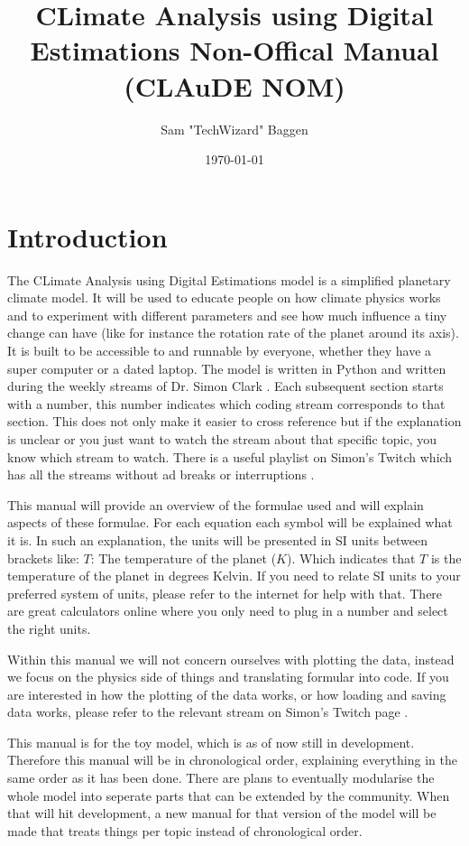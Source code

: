 \documentclass{article}
\title{CLimate Analysis using Digital Estimations Non-Offical Manual (CLAuDE NOM)}
\author{Sam "TechWizard" Baggen}
\date{\today}
\begin{document}
\maketitle

\tableofcontents

\section{Introduction}

The CLimate Analysis using Digital Estimations model is a simplified planetary climate model. It will be used to educate people on how climate physics works and to experiment with different 
parameters and see how much influence a tiny change can have (like for instance the rotation rate of the planet around its axis). It is built to be accessible to and runnable by everyone, 
whether they have a super computer or a dated laptop. The model is written in Python and written during the weekly streams of Dr. Simon Clark \cite{twitch}. Each subsequent section starts with a 
number, this number indicates which coding stream corresponds to that section. This does not only make it easier to cross reference but if the explanation is unclear or you just want to watch 
the stream about that specific topic, you know which stream to watch. There is a useful playlist on Simon's Twitch which has all the streams without ad breaks or interruptions \cite{playlist}. 

This manual will provide an overview of the formulae used and will explain aspects of these formulae. For each equation each symbol will be explained what it is. In such an explanation, the units 
will be presented in SI units \cite{SI} between brackets like: $T$: The temperature of the planet ($K$). Which indicates that $T$ is the temperature of the planet in degrees Kelvin. If you need 
to relate SI units to your preferred system of units, please refer to the internet for help with that. There are great calculators online where you only need to plug in a number and select the 
right units.

Within this manual we will not concern ourselves with plotting the data, instead we focus on the physics side of things and translating formular into code. If you are interested in how the
plotting of the data works, or how loading and saving data works, please refer to the relevant stream on Simon's Twitch page \cite{twitch}.

This manual is for the toy model, which is as of now still in development. Therefore this manual will be in chronological order, explaining everything in the same order as it has been done. 
There are plans to eventually modularise the whole model into seperate parts that can be extended by the community. When that will hit development, a new manual for that version of the model
will be made that treats things per topic instead of chronological order. 
\end{document}
